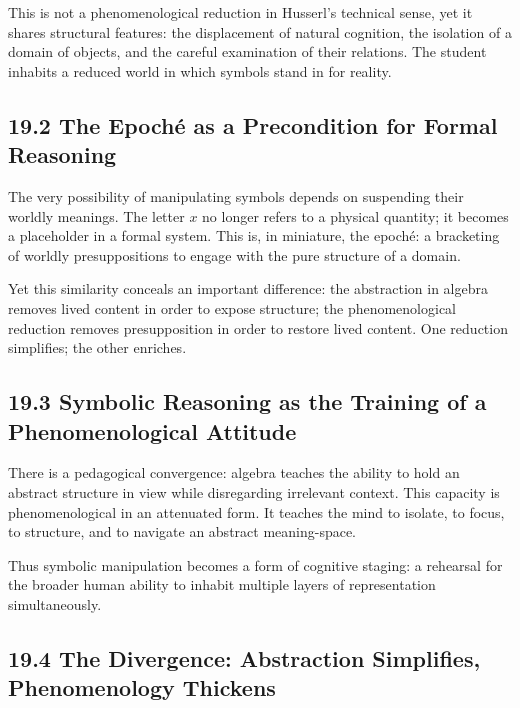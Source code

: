 \documentclass[12pt,letterpaper]{article}
\theoremstyle{remark}
\begin{document}
This is not a phenomenological reduction in Husserl’s technical sense, yet it shares structural features: the displacement of natural cognition, the isolation of a domain of objects, and the careful examination of their relations. The student inhabits a reduced world in which symbols stand in for reality.

\subsection{19.2 The Epoché as a Precondition for Formal Reasoning}

The very possibility of manipulating symbols depends on suspending their worldly meanings. The letter \(x\) no longer refers to a physical quantity; it becomes a placeholder in a formal system. This is, in miniature, the epoché: a bracketing of worldly presuppositions to engage with the pure structure of a domain.

Yet this similarity conceals an important difference: the abstraction in algebra removes lived content in order to expose structure; the phenomenological reduction removes presupposition in order to restore lived content. One reduction simplifies; the other enriches.

\subsection{19.3 Symbolic Reasoning as the Training of a Phenomenological Attitude}

There is a pedagogical convergence: algebra teaches the ability to hold an abstract structure in view while disregarding irrelevant context. This capacity is phenomenological in an attenuated form. It teaches the mind to isolate, to focus, to structure, and to navigate an abstract meaning-space.

Thus symbolic manipulation becomes a form of cognitive staging: a rehearsal for the broader human ability to inhabit multiple layers of representation simultaneously.

\subsection{19.4 The Divergence: Abstraction Simplifies, Phenomenology Thickens}
\end{document}
